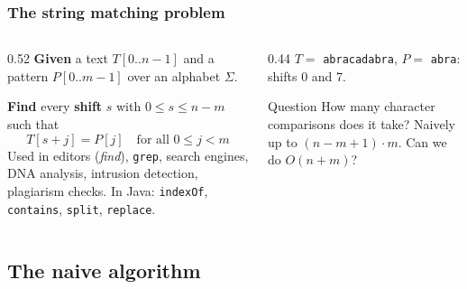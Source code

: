 \documentclass[aspectratio=169,10pt,compress]{beamer}
\begin{document}
\begin{frame}[t,fragile] \frametitle{The string matching problem}
  \begin{columns}[T]
    \begin{column}{0.52\textwidth}
      \textbf{Given} a text $T[0..n-1]$ and a pattern $P[0..m-1]$ over an alphabet $\Sigma$.

      \textbf{Find} every \textbf{shift} $s$ with $0 \le s \le n - m$ such that
      \[
      	T[s + j] = P[j] \quad \text{for all } 0 \le j < m
      \]
      \small Used in editors (\emph{find}), \texttt{grep}, search engines, DNA analysis, intrusion detection, plagiarism checks.
      In Java: \texttt{indexOf}, \texttt{contains}, \texttt{split}, \texttt{replace}.
    \end{column}
    \begin{column}{0.44\textwidth}
      \small $T = $ \texttt{abracadabra}, $P = $ \texttt{abra}: shifts 0 and 7.
      \begin{center}
      \end{center}
      \begin{alertblock}{Question}
        \small How many character comparisons does it take? Naively up to $(n - m + 1) \cdot m$.
        Can we do $O(n + m)$?
      \end{alertblock}
    \end{column}
  \end{columns}
\end{frame}

\subsection[Naive]{The naive algorithm}
\end{document}
